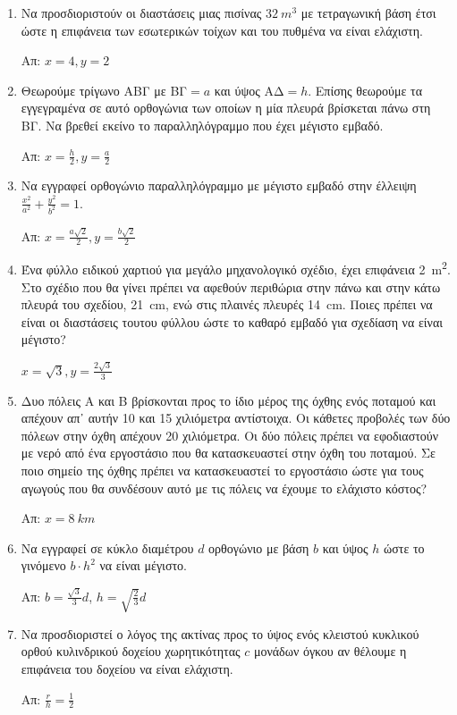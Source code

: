 \documentclass[a4paper,table]{report}
\begin{document}
\begin{center}
  \minibox{\large \bfseries \textcolor{Col1}{Προβλήματα Ακροτάτων}}
\end{center}

\vspace{\baselineskip}

\begin{enumerate}

	\item Να προσδιοριστούν οι διαστάσεις μιας πισίνας 
    $ \SI{32}{m^{3}} $ με τετραγωνική βάση έτσι ώστε η επιφάνεια των εσωτερικών 
    τοίχων και του πυθμένα να είναι ελάχιστη. 

		\hfill Απ: $x=4, y=2$

	\item Θεωρούμε τρίγωνο ΑΒΓ με  ΒΓ$=a $ και ύψος ΑΔ$=h$. Επίσης θεωρούμε τα
		εγγεγραμένα σε αυτό ορθογώνια των οποίων η μία πλευρά βρίσκεται πάνω στη
		ΒΓ. Να βρεθεί εκείνο το παραλληλόγραμμο που έχει μέγιστο εμβαδό.
		
		\hfill Απ: $ x = \frac{h}{2}, y= \frac{a}{2} $

	\item Να εγγραφεί ορθογώνιο παραλληλόγραμμο με μέγιστο εμβαδό στην έλλειψη $
		\frac{x^{2}}{a^{2}} + \frac{y^{2}}{b^{2}} = 1 $. 

		\hfill Απ: $ x = \frac{a\sqrt{2}}{2}, y = \frac{b \sqrt{2}}{2} $

	\item Ένα φύλλο ειδικού χαρτιού για μεγάλο μηχανολογικό σχέδιο, έχει
		επιφάνεια \SI{2}{m^{2}}. Στο σχέδιο που θα γίνει πρέπει να αφεθούν
		περιθώρια στην πάνω και στην κάτω πλευρά του σχεδίου, \SI{21}{cm}, ενώ
		στις πλαινές πλευρές \SI{14}{cm}. Ποιες πρέπει να είναι οι διαστάσεις
		τουτου φύλλου ώστε το καθαρό εμβαδό για σχεδίαση να είναι μέγιστο?

		\hfill $ x = \sqrt{3}, y = \frac{2 \sqrt{3}}{3} $

	\item Δυο πόλεις Α και Β βρίσκονται προς το ίδιο μέρος της όχθης ενός
		ποταμού και απέχουν απ᾽ αυτήν 10 και 15 χιλιόμετρα αντίστοιχα. Οι
		κάθετες προβολές των δύο πόλεων στην όχθη απέχουν 20 χιλιόμετρα. Οι δύο
		πόλεις πρέπει να εφοδιαστούν με νερό από ένα εργοστάσιο που θα
		κατασκευαστεί στην όχθη του ποταμού. Σε ποιο σημείο της όχθης πρέπει να
		κατασκευαστεί το εργοστάσιο ώστε για τους αγωγούς που θα συνδέσουν αυτό
		με τις πόλεις να έχουμε το ελάχιστο κόστος?

		\hfill Απ: $ x = \SI{8}{km} $

	\item Να εγγραφεί σε κύκλο διαμέτρου $d$ ορθογώνιο με βάση $b$ και ύψος $h$
		ώστε το γινόμενο $ b\cdot h^{2} $ να είναι μέγιστο.

		\hfill Απ: $b = \frac{\sqrt{3}}{3} d$, $ h = \sqrt{\frac{2}{3}
		} d $

	\item Να προσδιοριστεί ο λόγος της ακτίνας προς το ύψος ενός κλειστού
		κυκλικού ορθού κυλινδρικού δοχείου χωρητικότητας $c$ μονάδων όγκου αν
		θέλουμε η επιφάνεια του δοχείου να είναι ελάχιστη.

		\hfill Απ: $\frac{r}{h} = \frac{1}{2} $
		
\end{enumerate}
\end{document}
